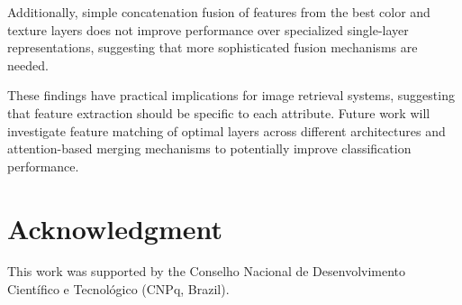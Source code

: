\documentclass[conference]{IEEEtran}
\begin{document}
Additionally, simple concatenation fusion of features from the best color and texture layers does not improve performance over specialized single-layer representations, suggesting that more sophisticated fusion mechanisms are needed.

These findings have practical implications for image retrieval systems, suggesting that feature extraction
should be specific to each attribute. Future work will investigate feature matching of optimal layers across different architectures and attention-based merging mechanisms to potentially improve classification performance.


\section*{Acknowledgment}

This work was supported by the Conselho Nacional de Desenvolvimento Científico e Tecnológico (CNPq, Brazil).
\end{document}
